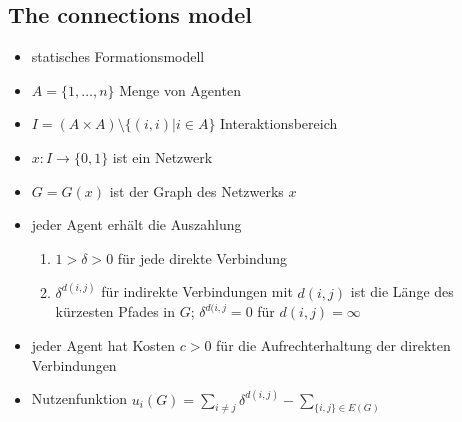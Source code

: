 \subsection{The connections model}
	\begin{itemize}
		\item statisches Formationsmodell
		\item $A=\{1,\dots,n\}$ Menge von Agenten
		\item $I=(A\times A)\setminus\{(i,i)|i\in A\}$ Interaktionsbereich
		\item $x:I\rightarrow\{0,1\}$ ist ein Netzwerk
		\item $G=G(x)$ ist der Graph des Netzwerks $x$
		\item jeder Agent erhält die Auszahlung
			\begin{enumerate}
				\item $1>\delta>0$ für jede direkte Verbindung
				\item $\delta^{d(i,j)}$ für indirekte Verbindungen mit $d(i,j)$ ist die Länge des kürzesten Pfades in $G$; $\delta^{d(i,j}=0$ für $d(i,j)=\infty$
			\end{enumerate}
		\item jeder Agent hat Kosten $c>0$ für die Aufrechterhaltung der direkten Verbindungen
		\item Nutzenfunktion $u_i(G)=\sum\limits_{i\neq j}\delta^{d(i,j)}-\sum\limits_{\{i,j\}\in E(G)}$
	\end{itemize}
